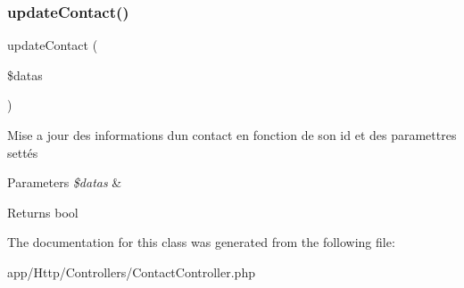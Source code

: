 \subsubsection{\texorpdfstring{update\+Contact()}{updateContact()}}
{\footnotesize\ttfamily update\+Contact (\begin{DoxyParamCaption}\item[{}]{\$datas }\end{DoxyParamCaption})}

Mise a jour des informations d\textquotesingle{}un contact en fonction de son id et des paramettres settés 
\begin{DoxyParams}{Parameters}
{\em \$datas} & \\
\hline
\end{DoxyParams}
\begin{DoxyReturn}{Returns}
bool 
\end{DoxyReturn}


The documentation for this class was generated from the following file\+:\begin{DoxyCompactItemize}
\item 
app/\+Http/\+Controllers/Contact\+Controller.\+php\end{DoxyCompactItemize}
